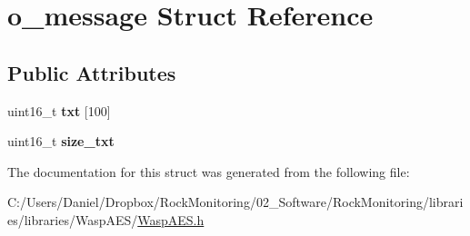 \hypertarget{structo__message}{}\section{o\+\_\+message Struct Reference}
\label{structo__message}
\subsection*{Public Attributes}
\begin{DoxyCompactItemize}
\item 
uint16\+\_\+t {\bfseries txt} \mbox{[}100\mbox{]}\hypertarget{structo__message_afb102c5957c5c3d9e90d89e8a9a82dac}{}\label{structo__message_afb102c5957c5c3d9e90d89e8a9a82dac}

\item 
uint16\+\_\+t {\bfseries size\+\_\+txt}\hypertarget{structo__message_ac4f87ce3cab7c4dc6acac9fdf1b7ed50}{}\label{structo__message_ac4f87ce3cab7c4dc6acac9fdf1b7ed50}

\end{DoxyCompactItemize}


The documentation for this struct was generated from the following file\+:\begin{DoxyCompactItemize}
\item 
C\+:/\+Users/\+Daniel/\+Dropbox/\+Rock\+Monitoring/02\+\_\+\+Software/\+Rock\+Monitoring/libraries/libraries/\+Wasp\+A\+E\+S/\hyperlink{_wasp_a_e_s_8h}{Wasp\+A\+E\+S.\+h}\end{DoxyCompactItemize}
